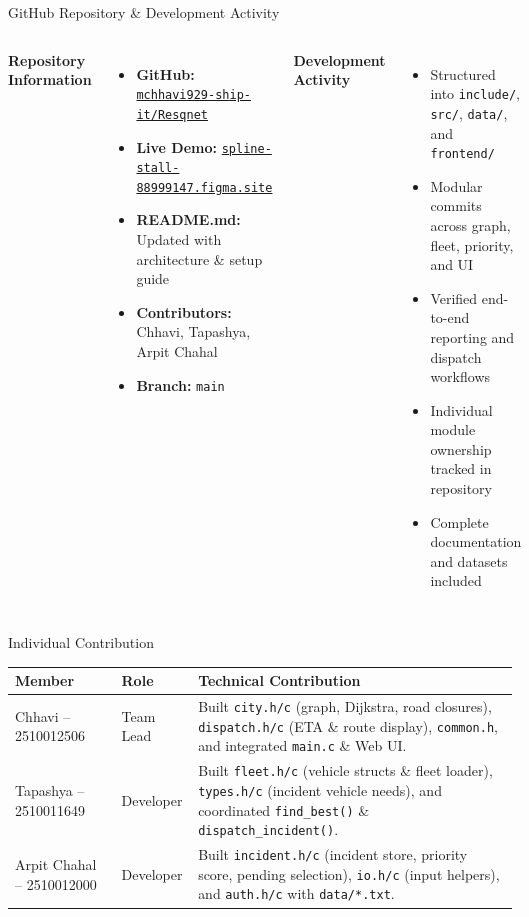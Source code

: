 \documentclass[aspectratio=169,11pt]{beamer}
\begin{document}
\begin{frame}{GitHub Repository \& Development Activity}
\footnotesize
\begin{columns}[T,totalwidth=\textwidth]
\textbf{\normalsize\color{GEUBlue}Repository Information}
\begin{itemize}\itemsep2.5pt
\item \textbf{GitHub:} \href{https://github.com/mchhavi929-ship-it/Resqnet}{\texttt{mchhavi929-ship-it/Resqnet}}
\item \textbf{Live Demo:} \href{https://spline-stall-88999147.figma.site}{\texttt{spline-stall-88999147.figma.site}}
\item \textbf{README.md:} Updated with architecture \& setup guide
\item \textbf{Contributors:} Chhavi, Tapashya, Arpit Chahal
\item \textbf{Branch:} \texttt{main}
\end{itemize}
\textbf{\normalsize\color{GEUBlue}Development Activity}
\begin{itemize}\itemsep2.5pt
\item Structured into \texttt{include/}, \texttt{src/}, \texttt{data/}, and \texttt{frontend/}
\item Modular commits across graph, fleet, priority, and UI
\item Verified end-to-end reporting and dispatch workflows
\item Individual module ownership tracked in repository
\item Complete documentation and datasets included
\end{itemize}
\end{columns}
\end{frame}

\begin{frame}{Individual Contribution}
\footnotesize
\begin{center}
\renewcommand{\arraystretch}{1.45}
\begin{tabularx}{.96\textwidth}{@{}>{\RaggedRight\arraybackslash}p{3.4cm}>{\RaggedRight\arraybackslash}p{2.0cm}>{\RaggedRight\arraybackslash}X@{}}
\toprule
\textbf{Member} & \textbf{Role} & \textbf{Technical Contribution} \\
\midrule
Chhavi -- 2510012506 & Team Lead & Built \texttt{city.h/c} (graph, Dijkstra, road closures), \texttt{dispatch.h/c} (ETA \& route display), \texttt{common.h}, and integrated \texttt{main.c} \& Web UI.\\
Tapashya -- 2510011649 & Developer & Built \texttt{fleet.h/c} (vehicle structs \& fleet loader), \texttt{types.h/c} (incident vehicle needs), and coordinated \texttt{find\_best()} \& \texttt{dispatch\_incident()}.\\
Arpit Chahal -- 2510012000 & Developer & Built \texttt{incident.h/c} (incident store, priority score, pending selection), \texttt{io.h/c} (input helpers), and \texttt{auth.h/c} with \texttt{data/*.txt}.\\
\bottomrule
\end{tabularx}
\end{center}
\end{frame}
\end{document}
